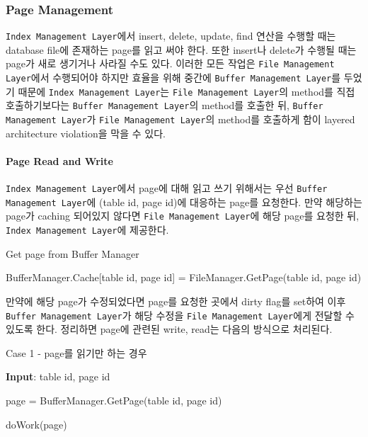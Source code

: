 \documentclass[main.tex]{subfiles}
\begin{document}
\subsubsection{Page Management}
\texttt{Index Management Layer}에서 insert, delete, update, find 연산을 수행할 때는 database file에 존재하는 page를 읽고 써야 한다. 또한 insert나 delete가 수행될 때는 page가 새로 생기거나 사라질 수도 있다. 이러한 모든 작업은 \texttt{File Management Layer}에서 수행되어야 하지만 효율을 위해 중간에 \texttt{Buffer Management Layer}를 두었기 때문에 \texttt{Index Management Layer}는 \texttt{File Management Layer}의 method를 직접 호출하기보다는 \texttt{Buffer Management Layer}의 method를 호출한 뒤, \texttt{Buffer Management Layer}가 \texttt{File Management Layer}의 method를 호출하게 함이 layered architecture violation을 막을 수 있다.

\paragraph{Page Read and Write}
\texttt{Index Management Layer}에서 page에 대해 읽고 쓰기 위해서는 우선 \texttt{Buffer Management Layer}에 (table id, page id)에 대응하는 page를 요청한다. 만약 해당하는 page가 caching 되어있지 않다면 \texttt{File Management Layer}에 해당 page를 요청한 뒤, \texttt{Index Management Layer}에 제공한다.

\begin{algorithm}[!hbt]
	\caption{Get page from Buffer Manager}
	\begin{algorithmic}
				\State BufferManager.Cache[table id, page id] = FileManager.GetPage(table id, page id)
			\EndIf
			
			\State {}
		\EndFunction
	\end{algorithmic}
\end{algorithm}

\newpage
만약에 해당 page가 수정되었다면 page를 요청한 곳에서 dirty flag를 set하여 이후 \texttt{Buffer Management Layer}가 해당 수정을 \texttt{File Management Layer}에게 전달할 수 있도록 한다.
정리하면 page에 관련된 write, read는 다음의 방식으로 처리된다.

\begin{algorithm}
	\caption{Case 1 - page를 읽기만 하는 경우}
	
	\hspace*{8pt} \textbf{Input}: table id, page id\\
	
	\begin{algorithmic}
		\State page = BufferManager.GetPage(table id, page id)
		
		\State doWork(page)
	\end{algorithmic}
\end{algorithm}
\end{document}

